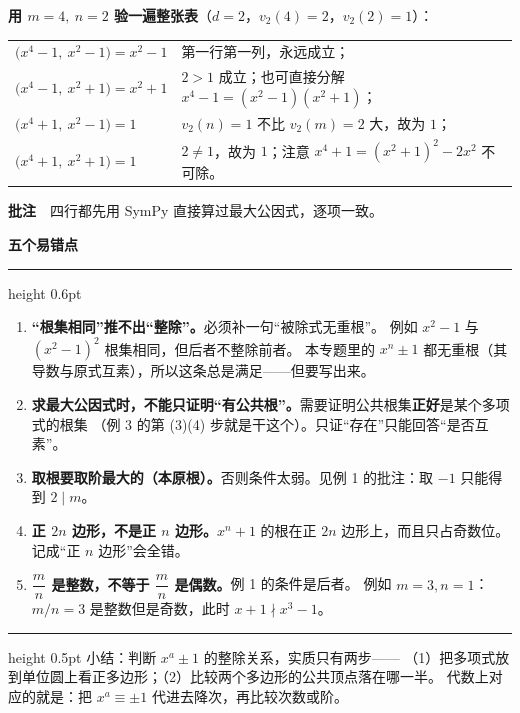 \documentclass[11pt,a4paper,fontset=windows]{ctexart}
\newcommand{\sect}[1]{\Needspace{12\baselineskip}\par\vspace{16pt}%
  {\large\bfseries\songti #1}\par\vspace{3pt}\hrule height 0.6pt\par\vspace{8pt}}
\newcommand{\uann}[1]{\par\vspace{3pt}\noindent
  {\small\color{hdgray}\songti\textbf{批注}\ \ #1}\par\vspace{1pt}}
\begin{document}
\smallskip
\textbf{用 $m=4,\ n=2$ 验一遍整张表}（$d=2$，$v_{2}(4)=2$，$v_{2}(2)=1$）：

\begin{center}
\renewcommand{\arraystretch}{1.6}
\begin{tabular}{@{}l l@{}}
$\bigl(x^{4}-1,\ x^{2}-1\bigr)=x^{2}-1$ & 第一行第一列，永远成立；\\[2pt]
$\bigl(x^{4}-1,\ x^{2}+1\bigr)=x^{2}+1$ & $2>1$ 成立；也可直接分解 $x^{4}-1=(x^{2}-1)(x^{2}+1)$；\\[2pt]
$\bigl(x^{4}+1,\ x^{2}-1\bigr)=1$ & $v_{2}(n)=1$ 不比 $v_{2}(m)=2$ 大，故为 $1$；\\[2pt]
$\bigl(x^{4}+1,\ x^{2}+1\bigr)=1$ & $2\neq1$，故为 $1$；注意 $x^{4}+1=(x^{2}+1)^{2}-2x^{2}$ 不可除。\\
\end{tabular}
\end{center}

\uann{四行都先用 SymPy 直接算过最大公因式，逐项一致。}

\sect{5\quad 五个易错点}

\begin{enumerate}[leftmargin=2.2em,itemsep=7pt,topsep=3pt]
\item \textbf{“根集相同”推不出“整除”。}必须补一句“被除式无重根”。
例如 $x^{2}-1$ 与 $(x^{2}-1)^{2}$ 根集相同，但后者不整除前者。
本专题里的 $x^{n}\pm1$ 都无重根（其导数与原式互素），所以这条总是满足——但要写出来。

\item \textbf{求最大公因式时，不能只证明“有公共根”。}需要证明公共根集\textbf{正好}是某个多项式的根集
（例 3 的第 (3)(4) 步就是干这个）。只证“存在”只能回答“是否互素”。

\item \textbf{取根要取阶最大的（本原根）。}否则条件太弱。见例 1 的批注：取 $-1$ 只能得到 $2\mid m$。

\item \textbf{正 $2n$ 边形，不是正 $n$ 边形。}$x^{n}+1$ 的根在正 $2n$ 边形上，而且只占奇数位。
记成“正 $n$ 边形”会全错。

\item \textbf{$\dfrac{m}{n}$ 是整数，不等于 $\dfrac{m}{n}$ 是偶数。}例 1 的条件是后者。
例如 $m=3,n=1$：$m/n=3$ 是整数但是奇数，此时 $x+1\nmid x^{3}-1$。
\end{enumerate}

\vspace{12pt}
\hrule height 0.5pt
\vspace{4pt}
{\small\color{hdgray}\songti 小结：判断 $x^{a}\pm1$ 的整除关系，实质只有两步——
（1）把多项式放到单位圆上看正多边形；（2）比较两个多边形的公共顶点落在哪一半。
代数上对应的就是：把 $x^{a}\equiv\pm1$ 代进去降次，再比较次数或阶。}
\end{document}
